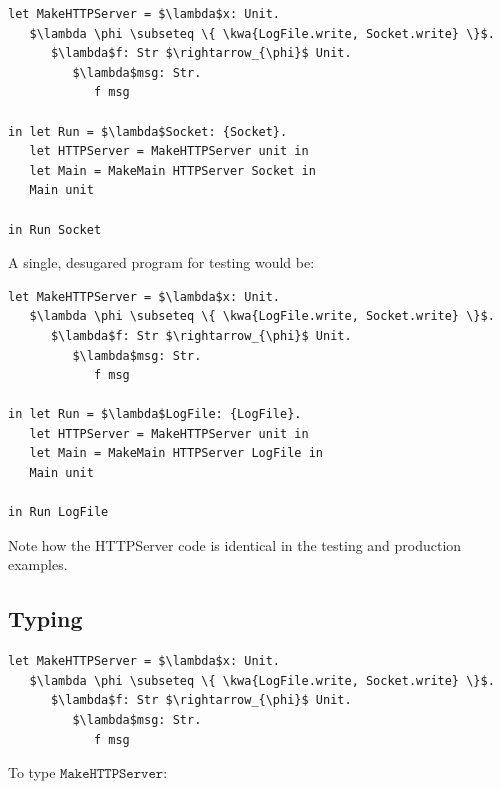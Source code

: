 \documentclass{llncs}
\newcommand{\keywadj}[1]{\mathtt{#1}}
\newcommand{\kwa}[1]{\keywadj{ #1 }}
\begin{document}
\begin{lstlisting}
let MakeHTTPServer = $\lambda$x: Unit.
   $\lambda \phi \subseteq \{ \kwa{LogFile.write, Socket.write} \}$.
      $\lambda$f: Str $\rightarrow_{\phi}$ Unit.
         $\lambda$msg: Str.
            f msg

in let Run = $\lambda$Socket: {Socket}.
   let HTTPServer = MakeHTTPServer unit in
   let Main = MakeMain HTTPServer Socket in
   Main unit

in Run Socket 
\end{lstlisting}

\noindent
A single, desugared program for testing would be:

\begin{lstlisting}
let MakeHTTPServer = $\lambda$x: Unit.
   $\lambda \phi \subseteq \{ \kwa{LogFile.write, Socket.write} \}$.
      $\lambda$f: Str $\rightarrow_{\phi}$ Unit.
         $\lambda$msg: Str.
            f msg

in let Run = $\lambda$LogFile: {LogFile}.
   let HTTPServer = MakeHTTPServer unit in
   let Main = MakeMain HTTPServer LogFile in
   Main unit

in Run LogFile
\end{lstlisting}

\noindent
Note how the HTTPServer code is identical in the testing and production examples.

\subsection*{Typing}


\begin{lstlisting}
let MakeHTTPServer = $\lambda$x: Unit.
   $\lambda \phi \subseteq \{ \kwa{LogFile.write, Socket.write} \}$.
      $\lambda$f: Str $\rightarrow_{\phi}$ Unit.
         $\lambda$msg: Str.
            f msg
\end{lstlisting}

\noindent
To type $\kwa{MakeHTTPServer}$:
\end{document}
